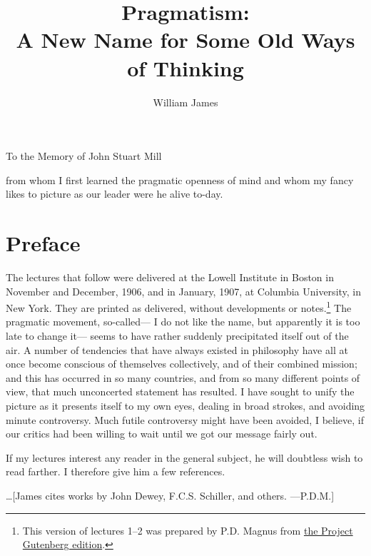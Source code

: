 \documentclass[]{article}
\begin{document}

\title{Pragmatism:\\ A New Name for Some Old Ways of Thinking}
\author{William James}
\date{}
\maketitle


\begin{center}
To the Memory of John Stuart Mill

from whom I first learned the pragmatic openness of mind and whom my
fancy likes to picture as our leader were he alive to-day.
\end{center}



\section*{Preface}

The lectures that follow were delivered at the Lowell Institute in
Boston in November and December, 1906, and in January, 1907, at
Columbia University, in New York. They are printed as delivered, without
developments or notes.\footnote{This version of lectures 1--2 was prepared by P.D. Magnus from \href{http://www.gutenberg.org/ebooks/5116}{the Project Gutenberg edition}.} The pragmatic movement, so-called--- I do not like
the name, but apparently it is too late to change it--- seems to have
rather suddenly precipitated itself out of the air. A number of
tendencies that have always existed in philosophy have all at once
become conscious of themselves collectively, and of their combined
mission; and this has occurred in so many countries, and from so many
different points of view, that much unconcerted statement has resulted.
I have sought to unify the picture as it presents itself to my own eyes,
dealing in broad strokes, and avoiding minute controversy. Much futile
controversy might have been avoided, I believe, if our critics had been
willing to wait until we got our message fairly out.

If my lectures interest any reader in the general subject, he will
doubtless wish to read farther. I therefore give him a few references.

\medskip

\ldots [James cites works by John Dewey, F.C.S. Schiller, and others. ---P.D.M.]
\end{document}
